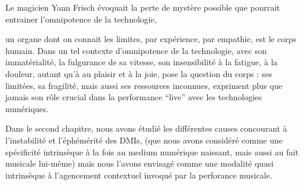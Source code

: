 Le magicien Yann Frisch évoquait la perte de mystère possible que pourrait entrainer l'omnipotence de la technologie,

un organe dont on connait les limites, par expérience, par empathie, est le corps humain. 
Dans un tel contexte d'omnipotence de la technologie, avec son immatérialité, la fulgurance de sa vitesse, son insensibilité à la fatigue, à la douleur, autant qu'à au plaisir et à la joie, pose la question du corps : ses limitées, sa fragilité, mais aussi ses ressources inconnues, expriment plus que jamais son rôle crucial dans la performance ``live'' avec les technologies numériques.




Dans le second chapitre, nous avons étudié les différentes causes concourant à l'instabilité et l'éphémérité des \glspl{DMI}, (que nous avons considéré comme une spécificité intrinsèque à la fois au  medium numérique naissant, mais aussi au fait musicale lui-même) mais nous l'avons envisagé comme une modalité quasi intrinsèque à l'agencement contextuel invoqué par la perforance musicale.